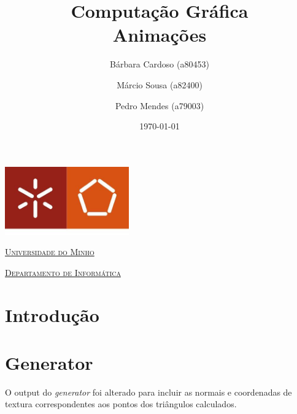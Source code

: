 \documentclass[a4paper]{article}
\begin{document}
\title{Computação Gráfica\\ Animações}
\author{Bárbara Cardoso (a80453) \and Márcio Sousa (a82400) \and Pedro Mendes (a79003)}
\date{\today}

\begin{titlepage}

    \thispagestyle{empty}
    \begin{center}
        \begin{minipage}{0.75\linewidth}
            \centering
            \includegraphics[width=0.4\textwidth]{eng.jpeg}\par\vspace{1cm}
            \vspace{1.5cm}
            \href{https://www.uminho.pt/PT}{\scshape\LARGE Universidade do Minho} \par
            \vspace{1cm}
            \href{https://www.di.uminho.pt/}{\scshape\Large Departamento de Informática} \par
            \vspace{1.5cm}

            \maketitle
        \end{minipage}
    \end{center}

\end{titlepage}

\tableofcontents

\pagebreak

\section{Introdução}

\section{Generator}

O output do \textit{generator} foi alterado para incluir as normais e
coordenadas de textura correspondentes aos pontos dos triângulos calculados.
\end{document}
